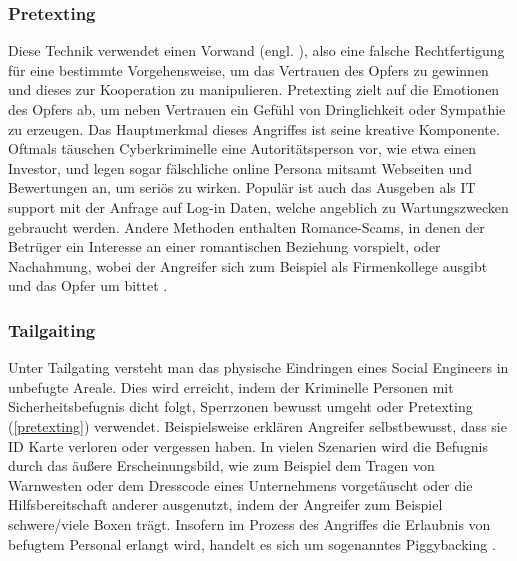 \subsubsection{Pretexting}
\label{pretexting}
Diese Technik verwendet einen Vorwand (engl. ), also eine falsche Rechtfertigung für eine bestimmte Vorgehensweise, um das Vertrauen des
Opfers zu gewinnen und dieses zur Kooperation zu manipulieren. Pretexting zielt auf die Emotionen des Opfers ab, um neben Vertrauen ein Gefühl von
Dringlichkeit oder Sympathie zu erzeugen. Das Hauptmerkmal dieses Angriffes ist seine kreative Komponente. Oftmals täuschen Cyberkriminelle
eine Autoritätsperson vor, wie etwa einen Investor, und legen sogar fälschliche online Persona mitsamt Webseiten und Bewertungen an, um seriös zu wirken.
Populär ist auch das Ausgeben als IT support mit der Anfrage auf Log-in Daten, welche angeblich zu Wartungszwecken gebraucht werden.
Andere Methoden enthalten Romance-Scams, in denen der Betrüger ein Interesse an einer romantischen Beziehung vorspielt, oder Nachahmung, wobei der
Angreifer sich zum Beispiel als Firmenkollege ausgibt und das Opfer um  bittet .

\subsubsection{Tailgaiting}
\label{tailgating}
Unter Tailgating versteht man das physische Eindringen eines Social Engineers in unbefugte Areale.
Dies wird erreicht, indem der Kriminelle Personen mit Sicherheitsbefugnis dicht folgt, Sperrzonen bewusst umgeht oder Pretexting (\autoref{pretexting})
verwendet. Beispielsweise erklären Angreifer selbstbewusst, dass sie ID Karte verloren oder vergessen haben. In vielen Szenarien wird die
Befugnis durch das äußere Erscheinungsbild, wie zum Beispiel dem Tragen von Warnwesten oder dem Dresscode eines Unternehmens vorgetäuscht oder die Hilfsbereitschaft anderer ausgenutzt,
indem der Angreifer zum Beispiel schwere/viele Boxen trägt. Insofern im Prozess des Angriffes die Erlaubnis von befugtem Personal erlangt wird, handelt es sich um sogenanntes Piggybacking .

